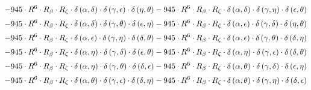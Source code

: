 \begin{subequations}
\begin{gather}
 \\[0.2em] \notag 		 - 945 \cdot R^{6} \cdot R_{\beta{}} \cdot R_{\zeta{}} \cdot \delta{}\left(\alpha{}, \delta{}\right) \cdot \delta{}\left(\gamma{}, \epsilon{}\right) \cdot \delta{}\left(\eta{}, \theta{}\right)- 945 \cdot R^{6} \cdot R_{\beta{}} \cdot R_{\zeta{}} \cdot \delta{}\left(\alpha{}, \delta{}\right) \cdot \delta{}\left(\gamma{}, \eta{}\right) \cdot \delta{}\left(\epsilon{}, \theta{}\right) 
 \\[0.2em] \notag 		 - 945 \cdot R^{6} \cdot R_{\beta{}} \cdot R_{\zeta{}} \cdot \delta{}\left(\alpha{}, \delta{}\right) \cdot \delta{}\left(\gamma{}, \theta{}\right) \cdot \delta{}\left(\epsilon{}, \eta{}\right)- 945 \cdot R^{6} \cdot R_{\beta{}} \cdot R_{\zeta{}} \cdot \delta{}\left(\alpha{}, \epsilon{}\right) \cdot \delta{}\left(\gamma{}, \delta{}\right) \cdot \delta{}\left(\eta{}, \theta{}\right) 
 \\[0.2em] \notag 		 - 945 \cdot R^{6} \cdot R_{\beta{}} \cdot R_{\zeta{}} \cdot \delta{}\left(\alpha{}, \epsilon{}\right) \cdot \delta{}\left(\gamma{}, \eta{}\right) \cdot \delta{}\left(\delta{}, \theta{}\right)- 945 \cdot R^{6} \cdot R_{\beta{}} \cdot R_{\zeta{}} \cdot \delta{}\left(\alpha{}, \epsilon{}\right) \cdot \delta{}\left(\gamma{}, \theta{}\right) \cdot \delta{}\left(\delta{}, \eta{}\right) 
 \\[0.2em] \notag 		 - 945 \cdot R^{6} \cdot R_{\beta{}} \cdot R_{\zeta{}} \cdot \delta{}\left(\alpha{}, \eta{}\right) \cdot \delta{}\left(\gamma{}, \delta{}\right) \cdot \delta{}\left(\epsilon{}, \theta{}\right)- 945 \cdot R^{6} \cdot R_{\beta{}} \cdot R_{\zeta{}} \cdot \delta{}\left(\alpha{}, \eta{}\right) \cdot \delta{}\left(\gamma{}, \epsilon{}\right) \cdot \delta{}\left(\delta{}, \theta{}\right) 
 \\[0.2em] \notag 		 - 945 \cdot R^{6} \cdot R_{\beta{}} \cdot R_{\zeta{}} \cdot \delta{}\left(\alpha{}, \eta{}\right) \cdot \delta{}\left(\gamma{}, \theta{}\right) \cdot \delta{}\left(\delta{}, \epsilon{}\right)- 945 \cdot R^{6} \cdot R_{\beta{}} \cdot R_{\zeta{}} \cdot \delta{}\left(\alpha{}, \theta{}\right) \cdot \delta{}\left(\gamma{}, \delta{}\right) \cdot \delta{}\left(\epsilon{}, \eta{}\right) 
 \\[0.2em] \notag 		 - 945 \cdot R^{6} \cdot R_{\beta{}} \cdot R_{\zeta{}} \cdot \delta{}\left(\alpha{}, \theta{}\right) \cdot \delta{}\left(\gamma{}, \epsilon{}\right) \cdot \delta{}\left(\delta{}, \eta{}\right)- 945 \cdot R^{6} \cdot R_{\beta{}} \cdot R_{\zeta{}} \cdot \delta{}\left(\alpha{}, \theta{}\right) \cdot \delta{}\left(\gamma{}, \eta{}\right) \cdot \delta{}\left(\delta{}, \epsilon{}\right) 

\end{gather}
\end{subequations}
